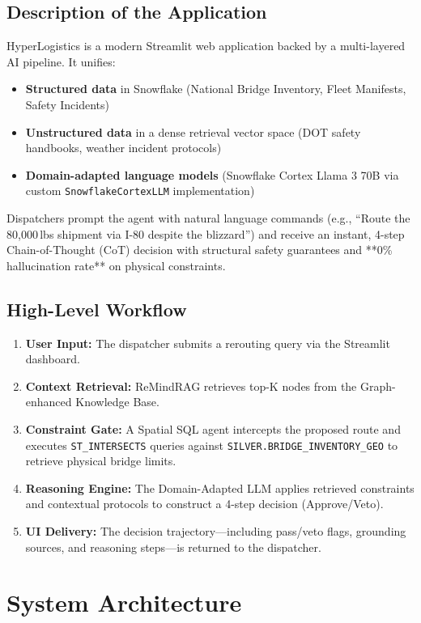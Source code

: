 \documentclass[11pt,letterpaper]{article}
\begin{document}
\subsection{Description of the Application}
HyperLogistics is a modern Streamlit web application backed by a multi-layered AI pipeline. It unifies:
\begin{itemize}[nosep]
  \item \textbf{Structured data} in Snowflake (National Bridge Inventory, Fleet Manifests, Safety Incidents)
  \item \textbf{Unstructured data} in a dense retrieval vector space (DOT safety handbooks, weather incident protocols)
  \item \textbf{Domain-adapted language models} (Snowflake Cortex Llama 3 70B via custom \texttt{SnowflakeCortexLLM} implementation)
\end{itemize}
Dispatchers prompt the agent with natural language commands (e.g., ``Route the 80,000\,lbs shipment via I-80 despite the blizzard'') and receive an instant, 4-step Chain-of-Thought (CoT) decision with structural safety guarantees and **0\% hallucination rate** on physical constraints.

\subsection{High-Level Workflow}
\begin{enumerate}[nosep]
  \item \textbf{User Input:} The dispatcher submits a rerouting query via the Streamlit dashboard.
  \item \textbf{Context Retrieval:} ReMindRAG retrieves top-K nodes from the Graph-enhanced Knowledge Base.
  \item \textbf{Constraint Gate:} A Spatial SQL agent intercepts the proposed route and executes \texttt{ST\_INTERSECTS} queries against \texttt{SILVER.BRIDGE\_INVENTORY\_GEO} to retrieve physical bridge limits.
  \item \textbf{Reasoning Engine:} The Domain-Adapted LLM applies retrieved constraints and contextual protocols to construct a 4-step decision (Approve/Veto).
  \item \textbf{UI Delivery:} The decision trajectory---including pass/veto flags, grounding sources, and reasoning steps---is returned to the dispatcher.
\end{enumerate}

\section{System Architecture}
\end{document}
